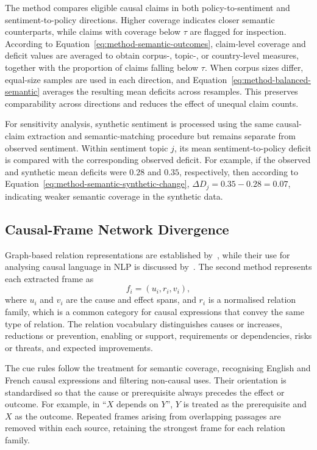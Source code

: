 {The method compares eligible causal claims in both policy-to-sentiment and
sentiment-to-policy directions. Higher coverage indicates closer semantic
counterparts, while claims with coverage below $\tau$ are flagged for inspection.
According to Equation~\ref{eq:method-semantic-outcomes}, claim-level coverage and
deficit values are averaged to obtain corpus-, topic-, or country-level measures,
together with the proportion of claims falling below $\tau$. When corpus sizes
differ, equal-size samples are used in each direction, and
Equation~\ref{eq:method-balanced-semantic} averages the resulting mean deficits
across resamples. This preserves comparability across directions and reduces the
effect of unequal claim counts.

For sensitivity analysis, synthetic sentiment is processed using the same
causal-claim extraction and semantic-matching procedure but remains separate from
observed sentiment. Within sentiment topic $j$, its mean sentiment-to-policy deficit
is compared with the corresponding observed deficit. For example, if the observed and
synthetic mean deficits were $0.28$ and $0.35$, respectively, then according to
Equation~\ref{eq:method-semantic-synthetic-change},
$\Delta D_j=0.35-0.28=0.07$, indicating weaker semantic coverage in the synthetic
data.
}

\subsection{Causal-Frame Network Divergence}
\label{subsec:method-frame-network}

Graph-based relation representations are established
by~\cite{horridge2011practical,merono2025knowledge}, while their use for analysing
causal language in NLP is discussed by~\cite{feder2022causal}. The second method
represents each extracted frame as
\begin{equation}
f_i=(u_i,r_i,v_i),
\label{eq:method-causal-frame}
\end{equation}
where $u_i$ and $v_i$ are the cause and effect spans, and $r_i$ is a normalised
relation family, which is a common category for causal expressions that convey the
same type of relation. The relation vocabulary distinguishes causes or increases,
reductions or prevention, enabling or support, requirements or dependencies, risks or
threats, and expected improvements.

The cue rules follow the treatment for semantic coverage, recognising English and
French causal expressions and filtering non-causal uses. Their orientation is
standardised so that the cause or prerequisite always precedes the effect or outcome.
For example, in ``$X$ depends on $Y$'', $Y$ is treated as the prerequisite and $X$ as
the outcome. Repeated frames arising from overlapping passages are removed within
each source, retaining the strongest frame for each relation family.

